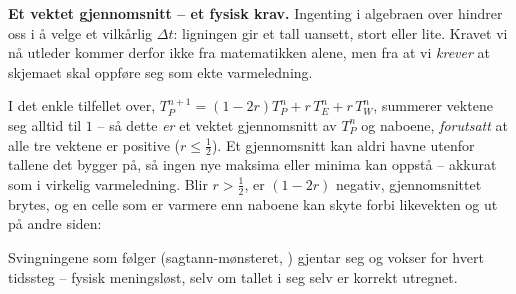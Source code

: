 \textbf{Et vektet gjennomsnitt -- et fysisk krav.} Ingenting i algebraen over hindrer oss i å velge et vilkårlig $\Delta t$: ligningen gir et tall uansett, stort eller lite. Kravet vi nå utleder kommer derfor ikke fra matematikken alene, men fra at vi \emph{krever} at skjemaet skal oppføre seg som ekte varmeledning.

I det enkle tilfellet over, $T_P^{n+1}=(1-2r)T_P^n+r\,T_E^n+r\,T_W^n$, summerer vektene seg alltid til $1$ -- så dette \emph{er} et vektet gjennomsnitt av $T_P^n$ og naboene, \emph{forutsatt} at alle tre vektene er positive ($r\le\tfrac12$). Et gjennomsnitt kan aldri havne utenfor tallene det bygger på, så ingen nye maksima eller minima kan oppstå -- akkurat som i virkelig varmeledning. Blir $r>\tfrac12$, er $(1-2r)$ negativ, gjennomsnittet brytes, og en celle som er varmere enn naboene kan skyte forbi likevekten og ut på andre siden:
\begin{center}
\end{center}
Svingningene som følger (sagtann-mønsteret, ) gjentar seg og vokser for hvert tidssteg -- fysisk meningsløst, selv om tallet i seg selv er korrekt utregnet.

